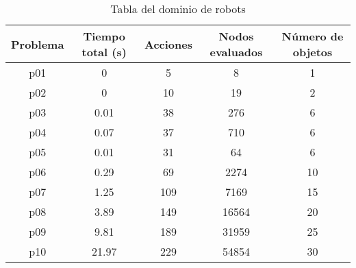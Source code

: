 \documentclass{article}
\begin{document}
\begin{table}[h]
    \centering
    \begin{tabular}{|c|c|c|c|c|}
    \hline
    \textbf{Problema} & \textbf{Tiempo total (s)} & \textbf{Acciones} & \textbf{Nodos evaluados} & \textbf{Número de objetos} \\ \hline
    p01               & 0                          & 5                  & 8                         & 1                           \\ \hline
    p02               & 0                          & 10                 & 19                        & 2                           \\ \hline
    p03               & 0.01                       & 38                 & 276                       & 6                           \\ \hline
    p04               & 0.07                       & 37                 & 710                       & 6                           \\ \hline
    p05               & 0.01                       & 31                 & 64                        & 6                           \\ \hline
    p06               & 0.29                       & 69                 & 2274                      & 10                          \\ \hline
    p07               & 1.25                       & 109                & 7169                      & 15                          \\ \hline
    p08               & 3.89                       & 149                & 16564                     & 20                          \\ \hline
    p09               & 9.81                       & 189                & 31959                     & 25                          \\ \hline
    p10               & 21.97                      & 229                & 54854                     & 30                          \\ \hline
    \end{tabular}
    \caption{Tabla del dominio de robots}
    \label{tabla:dominio_robots}
\end{table}
\end{document}
